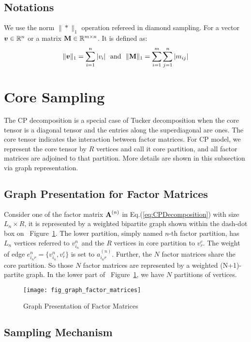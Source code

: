 \documentclass[letterpaper]{article}
\newcommand{\V}[1]{{\boldsymbol{{\MakeLowercase{#1}}}}}
\newcommand{\M}[1]{{\textbf{{\MakeUppercase{#1}}}}}
\newcommand{\Mn}[2]{\M{#1}^{(#2)}}
\newcommand{\norm}[2]{\|#1\|_{#2}}
\newcommand{\Eqn}[1]   {Eq.(\ref{eq:#1})}
\newcommand{\Fig}[1]   {Figure~\ref{fig:#1}}
\begin{document}
\subsection{Notations}

We use the norm $\norm{*}{1}$ operation refereed in diamond sampling.
For a vector $\V{v}\in \mathbb{R}^n$ or a matrix $\M{M}\in \mathbb{R}^{m\times n}$.
It is defined as:
\[
    \norm{\V{v}}{1} = \sum_{i=1}^{n}|v_i|
    \ \  {\rm and} \ \
    \norm{\M{M}}{1} = \sum_{i=1}^{m}\sum_{j=1}^{n}|m_{ij}|
\]


\section{Core Sampling}
The CP decomposition is a special case of Tucker decomposition
when the core tensor is a diagonal tensor and the entries along the superdiagonal are ones.
The core tensor indicates the interaction between factor matrices.
For CP model, we represent the core tensor by $R$ vertices and call it core partition,
and all factor matrices are adjoined to that partition.
More details are shown in this subsection via graph representation.

\subsection{Graph Presentation for Factor Matrices}
Consider one of the factor matrix $\Mn{A}{n}$ in \Eqn{CPDecomposition}
with size $L_n \times R$,
it is represented by a weighted bipartite graph shown within the dash-dot box on ~\Fig{GraphMatrices}.
The lower partition, simply named $n$-th factor partition, has $L_n$ vertices referred to $v^n_{i_n}$
and the $R$ vertices in core partition to $v^c_r$.
The weight of edge $e^n_{i_nr} = \{v^{n}_{i_n},v^c_r\}$ is set to $a^{(n)}_{i_nr}$.
Further, the $N$ factor matrices share the core partition.
So those $N$ factor matrices are represented by a weighted (N+1)-partite graph.
In the lower part of ~\Fig{GraphMatrices}, we have $N$ partitions of vertices.
\begin{figure}[t]
  \centering
  \texttt{[image: fig\_graph\_factor\_matrices]}\\
  \caption{Graph Presentation of Factor Matrices}
  \label{fig:GraphMatrices}
\end{figure}
\subsection{Sampling Mechanism}
\end{document}
